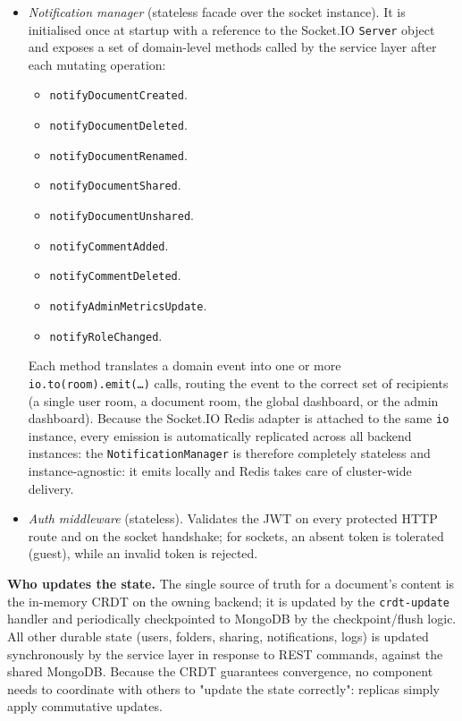 \documentclass{scrartcl}
\begin{document}
\begin{itemize}
    \item \textit{Notification manager} (stateless facade over the socket instance).  It is initialised
    once at startup with a reference to the Socket.IO \texttt{Server} object and exposes a set of
    domain-level methods called by the service layer after each mutating operation:
    \begin{itemize}
      \item \texttt{notifyDocumentCreated}.
      \item \texttt{notifyDocumentDeleted}.
      \item \texttt{notifyDocumentRenamed}.
      \item \texttt{notifyDocumentShared}.
      \item \texttt{notifyDocumentUnshared}.
      \item \texttt{notifyCommentAdded}.
      \item \texttt{notifyCommentDeleted}.
      \item \texttt{notifyAdminMetricsUpdate}.
      \item \texttt{notifyRoleChanged}.
    \end{itemize}
    Each method translates a domain event into one or more \texttt{io.to(room).emit(\ldots)} calls,
    routing the event to the correct set of recipients (a single user room, a document room, the
    global dashboard, or the admin dashboard). Because the Socket.IO Redis adapter is attached to the
    same \texttt{io} instance, every emission is automatically replicated across all backend instances:
    the \texttt{NotificationManager} is therefore completely stateless and instance-agnostic: it
    emits locally and Redis takes care of cluster-wide delivery.
    \item \textit{Auth middleware} (stateless). Validates the JWT on every protected HTTP route and on the socket handshake; for sockets, an absent token is tolerated (guest), while an invalid token is rejected.
  \end{itemize}

  \textbf{Who updates the state.} The single source of truth for a document's content is the in-memory CRDT on the owning backend; it is updated by the \texttt{crdt-update} handler and periodically checkpointed to MongoDB by the checkpoint/flush logic. All other durable state (users, folders, sharing, notifications, logs) is updated synchronously by the service layer in response to REST commands, against the shared MongoDB. Because the CRDT guarantees convergence, no component needs to coordinate with others to "update the state correctly": replicas simply apply commutative updates.
\end{document}
